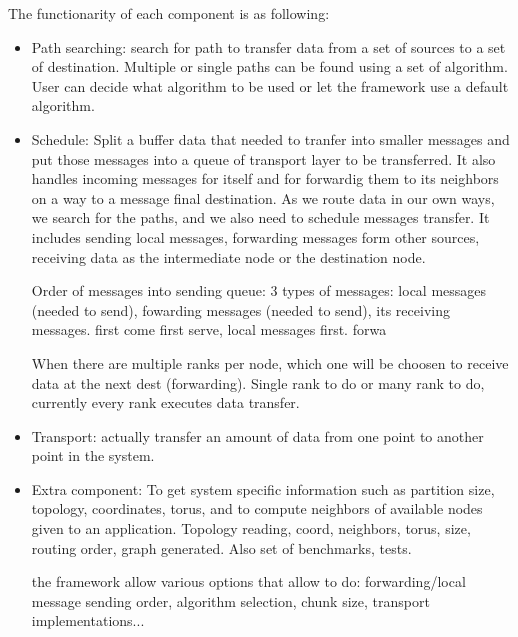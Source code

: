 The functionarity of each component is as following:
\begin{itemize}
\item Path searching: search for path to transfer data from a set of sources to a set of destination. Multiple or single paths can be found using a set of algorithm. User can decide what algorithm to be used or let the framework use a default algorithm.
\item Schedule: Split a buffer data that needed to tranfer into smaller messages and put those messages into a queue of transport layer to be transferred. It also handles incoming messages for itself and for forwardig them to its neighbors on a way to a message final destination.
As we route data in our own ways, we search for the paths, and we also need to schedule messages transfer. It includes sending local messages, forwarding messages form other sources, receiving data as the intermediate node or the destination node.

Order of messages into sending queue: 3 types of messages: local messages (needed to send), fowarding messages (needed to send), its receiving messages. first come first serve, local messages first. forwa

When there are multiple ranks per node, which one will be choosen to receive data at the next dest (forwarding). Single rank to do or many rank to do, currently every rank executes data transfer.

\item Transport: actually transfer an amount of data from one point to another point in the system.
\item Extra component: To get system specific information such as partition size, topology, coordinates, torus, and to compute neighbors of available nodes given to an application. Topology reading, coord, neighbors, torus, size, routing order, graph generated. Also set of benchmarks, tests.

the framework allow various options that allow to do: forwarding/local message sending order, algorithm selection, chunk size, transport implementations...
\end{itemize}
